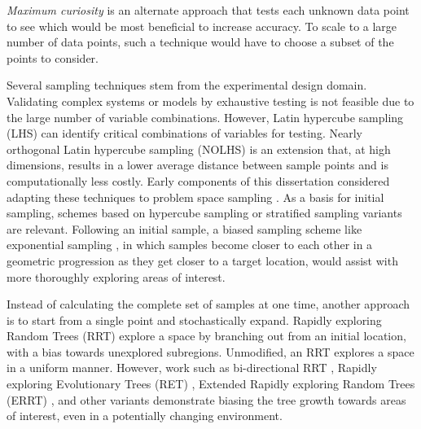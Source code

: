 \textit{Maximum curiosity} is an alternate approach that tests each unknown data point to see which would be most beneficial to increase accuracy.  To scale to a large number of data points, such a technique would have to choose a subset of the points to consider.


Several sampling techniques stem from the experimental design domain.   Validating complex systems or models by exhaustive testing is not feasible due to the large number of variable combinations.  However, Latin hypercube sampling (LHS) can identify critical combinations of variables for testing.   Nearly orthogonal Latin hypercube sampling (NOLHS) \citep{cioppa2002orthogonal}  is an extension that, at high dimensions, results in a lower average distance between sample points and is computationally less costly.  Early components of this dissertation considered adapting these techniques to problem space sampling \citep{holder08improving}.  As a basis for initial sampling, schemes based on hypercube sampling \citep{mckay79comparison, ye00algorithmic, cioppa2002orthogonal} or stratified sampling variants \citep{mckay79comparison, kwok2006semistatic} are relevant.  Following an initial sample, a biased sampling scheme like exponential sampling \citep{holder06company}, in which samples become closer to each other in a geometric progression as they get closer to a target location, would assist with more thoroughly exploring areas of interest.

Instead of calculating the complete set of samples at one time, another approach is to start from a single point and stochastically expand.  Rapidly exploring Random Trees (RRT) explore a space by branching out from an initial location, with a bias towards unexplored subregions.  Unmodified, an RRT explores a space in a uniform manner.  However, work such as bi-directional RRT  \citep{lavalle01randomized}, Rapidly exploring Evolutionary Trees (RET) \citep{martin09offline}, Extended Rapidly exploring Random Trees (ERRT) \citep{bruce02real-time}, and other variants \citep{zucker07multipartite, ferguson06replanning} demonstrate biasing the tree growth towards areas of interest, even in a potentially changing environment.  %




